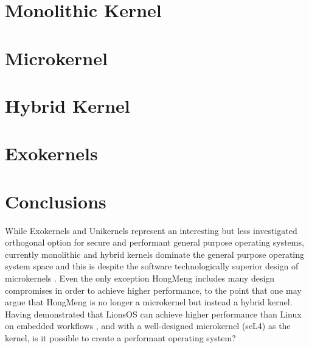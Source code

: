 \documentclass[../../thesis.tex]{subfiles}
\begin{document}
\section{Monolithic Kernel}


\section{Microkernel}

\section{Hybrid Kernel}


\section{Exokernels}


\section{Conclusions}
While Exokernels and Unikernels represent an interesting but less investigated orthogonal option for secure and performant general purpose operating systems, currently monolithic and hybrid kernels dominate the general purpose operating system space and this is despite the software technologically superior design of microkernels \citep{Liedtke_95}. Even the only exception HongMeng includes many design compromises in order to achieve higher performance, to the point that one may argue that HongMeng is no longer a microkernel but instead a hybrid kernel. Having demonstrated that LionsOS can achieve higher performance than Linux on embedded workflows \citep{Heiser_VCJGNLDZAZWPDB_25}, and with a well-designed microkernel (seL4) as the kernel, is it possible to create a performant operating system?

\end{document}
